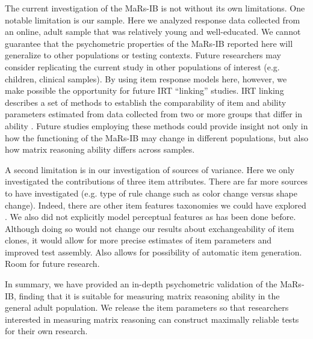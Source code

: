 \documentclass[a4paper,man,natbib]{apa6}
\begin{document}
The current investigation of the MaRs-IB is not without its own limitations. One notable limitation is our sample. Here we analyzed response data collected from an online, adult sample that was relatively young and well-educated. We cannot guarantee that the psychometric properties of the MaRs-IB reported here will generalize to other populations or testing contexts. Future researchers may consider replicating the current study in other populations of interest (e.g. children, clinical samples). By using item response models here, however, we make possible the opportunity for future IRT ``linking'' studies. IRT linking describes a set of methods to establish the comparability of item and ability parameters estimated from data collected from two or more groups that differ in ability \citep{lee2018irt}. Future studies employing these methods could provide insight not only in how the functioning of the MaRs-IB may change in different populations, but also how matrix reasoning ability differs across samples.

A second limitation is in our investigation of sources of variance. Here we only investigated the contributions of three item attributes. There are far more sources to have investigated (e.g. type of rule change such as color change versus shape change). Indeed, there are other item features taxonomies we could have explored \citep{carpenter1990one}. We also did not explicitly model perceptual features as has been done before. Although doing so would not change our results about exchangeability of item clones, it would allow for more precise estimates of item parameters and improved test assembly. Also allows for possibility of automatic item generation. Room for future research. 

In summary, we have provided an in-depth psychometric validation of the MaRs-IB, finding that it is suitable for measuring matrix reasoning ability in the general adult population. We release the item parameters so that researchers interested in measuring matrix reasoning can construct maximally reliable tests for their own research.


\end{document}
